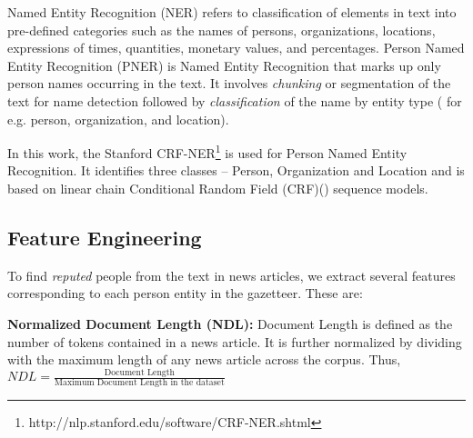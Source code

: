 \documentclass[a4paper,man,natbib]{apa6}
\begin{document}
\noindent Named Entity Recognition (NER) refers to classification of elements in text into pre-defined categories such as the names of persons, organizations, locations, expressions of times, quantities, monetary values, and percentages. 
Person Named Entity Recognition (PNER) is Named Entity Recognition that marks up only person names occurring in the text. It involves \emph{chunking} or segmentation of  the text for name detection followed by \emph{classification} of the name by entity type ( for e.g. person, organization, and location).


In this work, the Stanford CRF-NER\footnote{http://nlp.stanford.edu/software/CRF-NER.shtml} is used for Person Named Entity Recognition. It identifies three classes -- Person, Organization and Location and is based on linear chain Conditional Random Field (CRF)(\cite{mccallum2003early, finkel2005incorporating, sutton2011introduction}) sequence models. 

\subsection{Feature Engineering} 
\label{feat}
To find \emph{reputed} people from the text in news articles, we extract several features corresponding to each person entity in the gazetteer. These are:

\noindent \textbf{Normalized Document Length (NDL): } 
Document Length is defined as the number of tokens contained in a news article. It is further normalized by dividing with the maximum length of any news article across the corpus. Thus,  
$NDL= \frac{\text{Document Length}} {\text{Maximum Document Length in the dataset}}$
\end{document}
